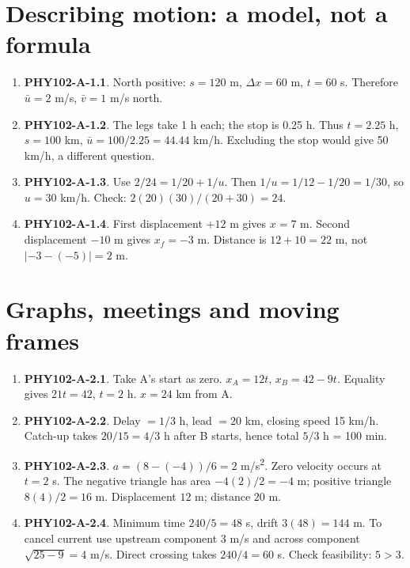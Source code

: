 \documentclass[11pt,a4paper,openany]{book}
\begin{document}
\section{Describing motion: a model, not a formula}
\begin{enumerate}
\item \textbf{PHY102-A-1.1}. North positive: $s=120$ m, $\Delta x=60$ m, $t=60$ s. Therefore $\bar u=2$ m/s, $\bar v=1$ m/s north.
\item \textbf{PHY102-A-1.2}. The legs take 1 h each; the stop is 0.25 h. Thus $t=2.25$ h, $s=100$ km, $\bar u=100/2.25=44.44$ km/h. Excluding the stop would give 50 km/h, a different question.
\item \textbf{PHY102-A-1.3}. Use $2/24=1/20+1/u$. Then $1/u=1/12-1/20=1/30$, so $u=30$ km/h. Check: $2(20)(30)/(20+30)=24$.
\item \textbf{PHY102-A-1.4}. First displacement $+12$ m gives $x=7$ m. Second displacement $-10$ m gives $x_f=-3$ m. Distance is $12+10=22$ m, not $|-3-(-5)|=2$ m.
\end{enumerate}
\section{Graphs, meetings and moving frames}
\begin{enumerate}
\item \textbf{PHY102-A-2.1}. Take A's start as zero. $x_A=12t$, $x_B=42-9t$. Equality gives $21t=42$, $t=2$ h. $x=24$ km from A.
\item \textbf{PHY102-A-2.2}. Delay $=1/3$ h, lead $=20$ km, closing speed 15 km/h. Catch-up takes $20/15=4/3$ h after B starts, hence total $5/3$ h = 100 min.
\item \textbf{PHY102-A-2.3}. $a=(8-(-4))/6=2$ m/s\textsuperscript{2}. Zero velocity occurs at $t=2$ s. The negative triangle has area $-4(2)/2=-4$ m; positive triangle $8(4)/2=16$ m. Displacement $12$ m; distance $20$ m.
\item \textbf{PHY102-A-2.4}. Minimum time $240/5=48$ s, drift $3(48)=144$ m. To cancel current use upstream component 3 m/s and across component $\sqrt{25-9}=4$ m/s. Direct crossing takes $240/4=60$ s. Check feasibility: $5>3$.
\end{enumerate}
\end{document}

